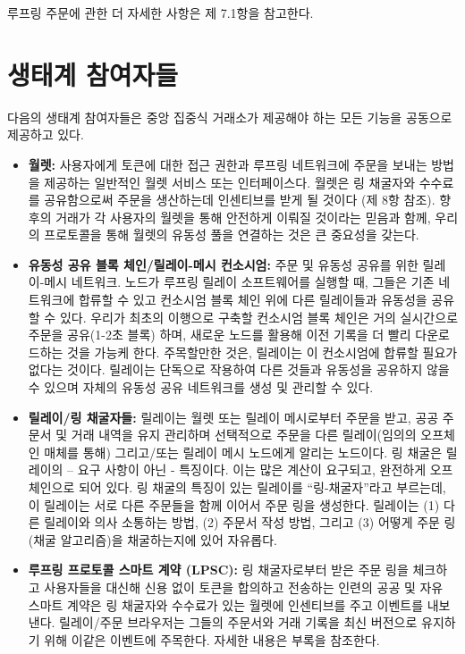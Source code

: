 \documentclass{article}
\begin{document}
\begin{multicols}{2}
루프링 주문에 관한 더 자세한 사항은 제 7.1항을 참고한다.  



\section{생태계 참여자들\label{sec:ecosystem}}
다음의 생태계 참여자들은 중앙 집중식 거래소가 제공해야 하는 모든 기능을 공동으로 제공하고 있다.

\begin{itemize}
	
	\item \textbf{월렛:} 사용자에게 토큰에 대한 접근 권한과 루프링 네트워크에 주문을 보내는 방법을 제공하는 일반적인 월렛 서비스 또는 인터페이스다. 월렛은 링 채굴자와 수수료를 공유함으로써 주문을 생산하는데 인센티브를 받게 될 것이다 (제 8항 참조). 향후의 거래가 각 사용자의 월렛을 통해 안전하게 이뤄질 것이라는 믿음과 함께, 우리의 프로토콜을 통해 월렛의 유동성 풀을 연결하는 것은 큰 중요성을 갖는다.

	\item \textbf{유동성 공유 블록 체인/릴레이-메시 컨소시엄:} 주문 및 유동성 공유를 위한 릴레이-메시 네트워크. 노드가 루프링 릴레이 소프트웨어를 실행할 때, 그들은 기존 네트워크에 합류할 수 있고 컨소시엄 블록 체인 위에 다른 릴레이들과 유동성을 공유할 수 있다. 우리가 최초의 이행으로 구축할 컨소시엄 블록 체인은 거의 실시간으로 주문을 공유(1-2초 블록) 하며, 새로운 노드를 활용해 이전 기록을 더 빨리 다운로드하는 것을 가능케 한다. 주목할만한 것은, 릴레이는 이 컨소시엄에 합류할 필요가 없다는 것이다. 릴레이는 단독으로 작용하여 다른 것들과 유동성을 공유하지 않을 수 있으며 자체의 유동성 공유 네트워크를 생성 및 관리할 수 있다.

	\item \textbf{릴레이/링 채굴자들:} 릴레이는 월렛 또는 릴레이 메시로부터 주문을 받고, 공공 주문서 및 거래 내역을 유지 관리하며 선택적으로 주문을 다른 릴레이(임의의 오프체인 매체를 통해) 그리고/또는 릴레이 메시 노드에게 알리는 노드이다. 링 채굴은 릴레이의 – 요구 사항이 아닌 - 특징이다. 이는 많은 계산이 요구되고, 완전하게 오프 체인으로 되어 있다. 링 채굴의 특징이 있는 릴레이를 “링-채굴자”라고 부르는데, 이 릴레이는 서로 다른 주문들을 함께 이어서 주문 링을 생성한다. 릴레이는 (1) 다른 릴레이와 의사 소통하는 방법, (2) 주문서 작성 방법, 그리고 (3) 어떻게 주문 링(채굴 알고리즘)을 채굴하는지에 있어 자유롭다.

	\item \textbf{루프링 프로토콜 스마트 계약 (LPSC):} 링 채굴자로부터 받은 주문 링을 체크하고 사용자들을 대신해 신용 없이 토큰을 합의하고 전송하는 인련의 공공 및 자유 스마트 계약은 링 채굴자와 수수료가 있는 월렛에 인센티브를 주고 이벤트를 내보낸다. 릴레이/주문 브라우저는 그들의 주문서와 거래 기록을 최신 버전으로 유지하기 위해 이같은 이벤트에 주목한다. 자세한 내용은 부록을 참조한다.


\end{itemize}
\end{multicols}
\end{document}

